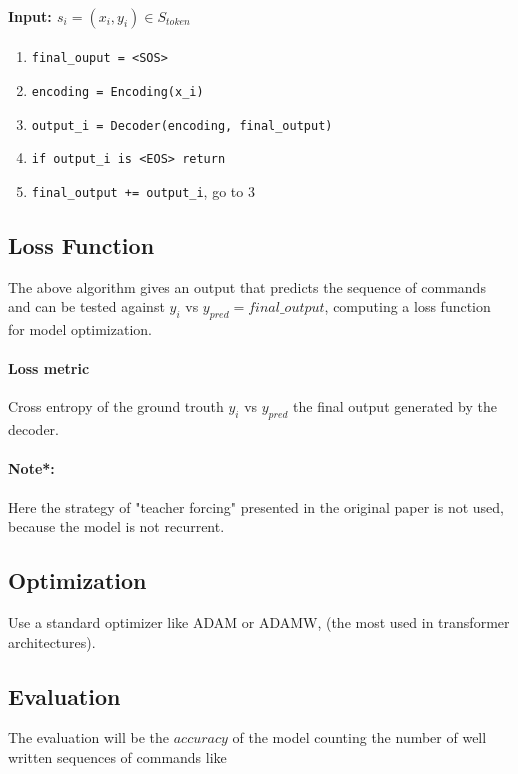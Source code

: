 \documentclass[]{article}
\begin{document}
\paragraph*{Input: $s_i = (x_i, y_i) \in S_{token}$}
\begin{enumerate}
    \item \texttt{final\_ouput = <SOS>}
    \item \texttt{encoding = Encoding(x\_i)}
    \item \texttt{output\_i = Decoder(encoding, final\_output)}
    \item \texttt{if output\_i is <EOS> return}
    \item \texttt{final\_output += output\_i}, go to 3
\end{enumerate}

\subsection*{Loss Function}
The above algorithm gives an output that predicts the sequence of commands and can be tested against $y_i$ vs $y_{pred} = final\_output$, computing a loss function for model optimization.

\paragraph*{Loss metric} Cross entropy of the ground trouth $y_i$ vs $y_{pred}$ the final output generated by the decoder.

\paragraph*{Note*:} Here the strategy of "teacher forcing" presented in the original paper is not used, because the model is not recurrent.


\subsection*{Optimization}

Use a standard optimizer like ADAM or ADAMW, (the most used in transformer architectures).

\subsection*{Evaluation}
The evaluation will be the $accuracy$ of the model counting the number of well written sequences of commands like
\end{document}
